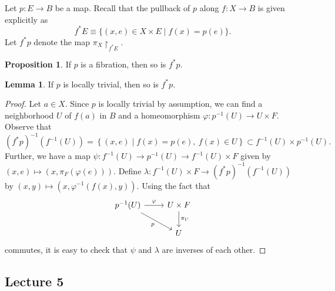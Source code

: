 \documentclass[10pt,letterpaper,cm]{nupset}
\theoremstyle{definition}
\theoremstyle{theorem}
\newtheorem{lemma}[defn]{Lemma}
\newtheorem{prop}[defn]{Proposition}
\theoremstyle{remark}
\newcommand{\1}{\mathbb{1}}
\newcommand{\0}{\vec 0}
\begin{document}
Let $p : E \to B$ be a map. Recall that the pullback of $p$ along $f : X \to B$ is given explicitly as   $$f^{\ast}{E} \equiv \{(x, e) \in X \times E \mid f(x) = p(e)\}.$$  Let  $f^{\ast}{p}$ denote the map $\pi_X\restriction_{f^{\ast}{E}}$.

\begin{prop}
If $p$ is a fibration, then so is $f^{\ast}{p}$.
\end{prop}

\begin{lemma}\label{pbtriv}
If $p$ is locally trivial, then so is $f^{\ast}{p}$. 
\end{lemma}
\begin{proof}
Let $a \in X$. Since $p$ is locally trivial by assumption, we can find a neighborhood $U$ of $f(a)$ in $B$ and a homeomorphism $\varphi : p^{-1}(U) \to U \times F$. Observe that 
\[
(f^{\ast}{p})^{-1}(f^{-1}(U)) = \left\{(x,e) \mid f(x) = p(e), \ f(x) \in U\right\} \subset f^{-1}(U) \times p^{-1}(U).
\] Further, we have a map $\psi : f^{-1}(U) \to p^{-1}(U) \to f^{-1}(U) \times F$ given by $(x,e) \mapsto (x, \pi_F(\varphi(e)))$. Define $\lambda : f^{-1}(U) \times F \to (f^{\ast}{p})^{-1}(f^{-1}(U))$ by $(x,y) \mapsto (x, \varphi^{-1}(f(x), y))$. Using the fact that 
\[
\begin{tikzcd}
p^{-1}(U) \arrow[r, "\varphi"] \arrow[rd, "p"'] & U\times F \arrow[d, "\pi_U"] \\
                                                    & U                           
\end{tikzcd}
\] commutes, it is easy to check that $\psi$ and $\lambda$ are inverses of each other. 
\end{proof}



\subsection{Lecture 5}
\end{document}
